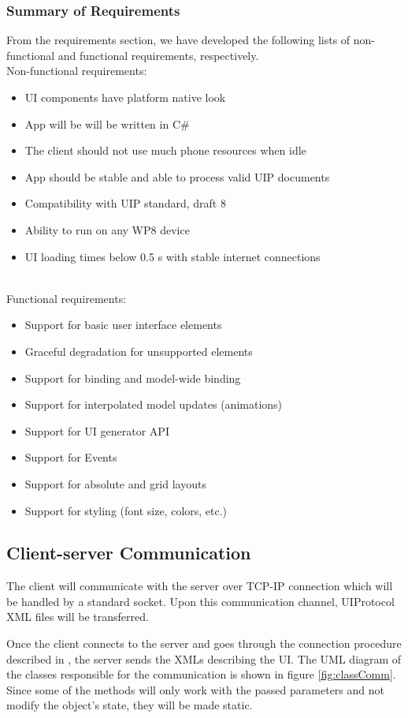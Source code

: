 \subsubsection{Summary of Requirements}
From the requirements section, we have developed the following lists of non-functional and functional requirements, respectively.
\\
Non-functional requirements:
\begin{itemize}
  \item UI components have platform native look
  \item App will be will be written in C\#
  \item The client should not use much phone resources when idle
  \item App should be stable and able to process valid UIP documents
  \item Compatibility with UIP standard, draft 8
  \item Ability to run on any WP8 device
  \item UI loading times below 0.5 s with stable internet connections
\end{itemize}
~\\
Functional requirements:
\begin{itemize}
  \item  Support for basic user interface elements
  \item Graceful degradation for unsupported elements
  \item  Support for binding and model-wide binding
  \item  Support for interpolated model updates (animations)
  \item  Support for UI generator API
  \item  Support for Events
  \item Support for absolute and grid layouts
  \item Support for styling (font size, colors, etc.)
\end{itemize}

\subsection{Client-server Communication}
The client will communicate with the server over TCP-IP connection which will be handled by a standard socket. Upon this communication channel, UIProtocol XML files will be transferred.

Once the client connects to the server and goes through the connection procedure described in \cite{uip}, the server sends the XMLs describing the UI. The UML diagram of the classes responsible for the communication is shown in figure \ref{fig:classComm}. Since some of the methods will only work with the passed parameters and not modify the object's state, they will be made static. 

